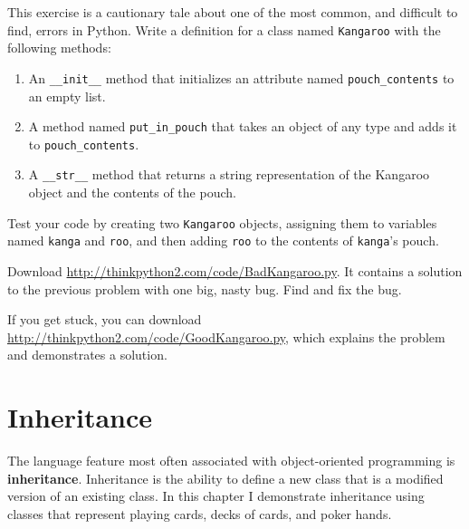 \documentclass[10pt]{book}
\begin{document}
\begin{exercise}
\label{kangaroo}

This exercise is a cautionary tale about one of the most
common, and difficult to find, errors in Python.
Write a definition for a class named {\tt Kangaroo} with the following
methods:

\begin{enumerate}

\item An \verb"__init__" method that initializes an attribute named
\verb"pouch_contents" to an empty list.

\item A method named \verb"put_in_pouch" that takes an object
of any type and adds it to \verb"pouch_contents".

\item A \verb"__str__" method that returns a string representation
of the Kangaroo object and the contents of the pouch.

\end{enumerate}
%
Test your code
by creating two {\tt Kangaroo} objects, assigning them to variables
named {\tt kanga} and {\tt roo}, and then adding {\tt roo} to the
contents of {\tt kanga}'s pouch.

Download \url{http://thinkpython2.com/code/BadKangaroo.py}.  It contains
a solution to the previous problem with one big, nasty bug.
Find and fix the bug.

If you get stuck, you can download
\url{http://thinkpython2.com/code/GoodKangaroo.py}, which explains the
problem and demonstrates a solution.

\end{exercise}



\chapter{Inheritance}

The language feature most often associated with object-oriented
programming is {\bf inheritance}.  Inheritance is the ability to
define a new class that is a modified version of an existing class.
In this chapter I demonstrate inheritance using classes that represent
playing cards, decks of cards, and poker hands.
\end{document}
